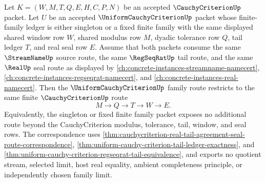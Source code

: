 \begin{theorem}
\label{thm:cauchycriterion-uniformcriterion-finite-family-reduction}
Let $K=(W,M,T,Q,E,H,C,P,N)$ be an accepted $\CauchyCriterionUp$ packet. Let
$U$ be an accepted $\UniformCauchyCriterionUp$ packet whose finite-family
ledger is either singleton or a fixed finite family with the same displayed
shared window row $W$, shared modulus row $M$, dyadic tolerance row $Q$, tail
ledger $T$, and real seal row $E$. Assume that both packets consume the same
$\StreamNameUp$ source route, the same $\RegSeqRatUp$ tail route, and the same
$\RealUp$ seal route as displayed by
\autoref{ch:concrete-instances-streamname-namecert},
\autoref{ch:concrete-instances-regseqrat-namecert}, and
\autoref{ch:concrete-instances-real-namecert}. Then the
$\UniformCauchyCriterionUp$ family route restricts to the same finite
$\CauchyCriterionUp$ route
$$
M\to Q\to T\to W\to E.
$$
Equivalently, the singleton or fixed finite family packet exposes no additional
route beyond the CauchyCriterion modulus, tolerance, tail, window, and seal
rows. The correspondence uses
\autoref{thm:cauchycriterion-real-tail-agreement-seal-route-correspondence},
\autoref{thm:uniform-cauchy-criterion-tail-ledger-exactness}, and
\autoref{thm:uniform-cauchy-criterion-regseqrat-tail-equivalence}, and exports
no quotient stream, selected limit, host real equality, ambient completeness
principle, or independently chosen family limit.
\end{theorem}
